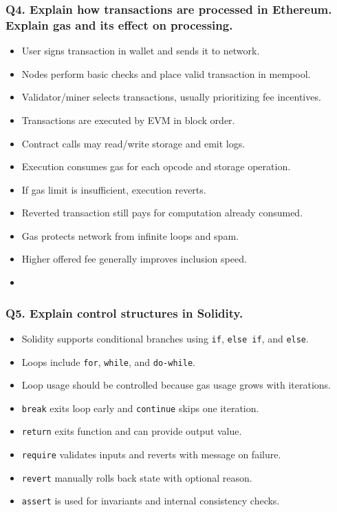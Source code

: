 \documentclass[12pt,a4paper]{article}
\begin{document}
\subsubsection*{Q4. Explain how transactions are processed in Ethereum. Explain gas and its effect on processing.}
\begin{itemize}
\item User signs transaction in wallet and sends it to network.
\item Nodes perform basic checks and place valid transaction in mempool.
\item Validator/miner selects transactions, usually prioritizing fee incentives.
\item Transactions are executed by EVM in block order.
\item Contract calls may read/write storage and emit logs.
\item Execution consumes gas for each opcode and storage operation.
\item If gas limit is insufficient, execution reverts.
\item Reverted transaction still pays for computation already consumed.
\item Gas protects network from infinite loops and spam.
\item Higher offered fee generally improves inclusion speed.
\item[]
\vspace{0.25em}
\noindent{}
\end{itemize}

\subsubsection*{Q5. Explain control structures in Solidity.}
\begin{itemize}
\item Solidity supports conditional branches using \texttt{if}, \texttt{else if}, and \texttt{else}.
\item Loops include \texttt{for}, \texttt{while}, and \texttt{do-while}.
\item Loop usage should be controlled because gas usage grows with iterations.
\item \texttt{break} exits loop early and \texttt{continue} skips one iteration.
\item \texttt{return} exits function and can provide output value.
\item \texttt{require} validates inputs and reverts with message on failure.
\item \texttt{revert} manually rolls back state with optional reason.
\item \texttt{assert} is used for invariants and internal consistency checks.
\end{itemize}
\end{document}
